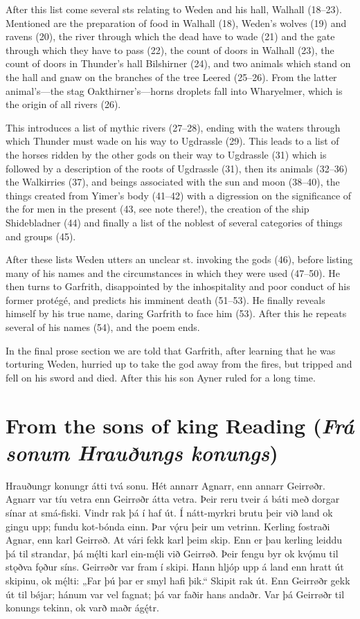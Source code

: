 After this list come several sts relating to Weden and his hall, Walhall (18–23). Mentioned are the preparation of food in Walhall (18), Weden’s wolves (19) and ravens (20), the river through which the dead have to wade (21) and the gate through which they have to pass (22), the count of doors in Walhall (23), the count of doors in Thunder’s hall Bilshirner (24), and two animals which stand on the hall and gnaw on the branches of the tree Leered (25–26). From the latter animal’s—the stag Oakthirner’s—horns droplets fall into Wharyelmer, which is the origin of all rivers (26).

This introduces a list of mythic rivers (27–28), ending with the waters through which Thunder must wade on his way to Ugdrassle (29). This leads to a list of the horses ridden by the other gods on their way to Ugdrassle (31) which is followed by a description of the roots of Ugdrassle (31), then its animals (32–36) the Walkirries (37), and beings associated with the sun and moon (38–40), the things created from Yimer’s body (41–42) with a digression on the significance of the  for men in the present (43, see note there!), the creation of the ship Shidebladner (44) and finally a list of the noblest of several categories of things and groups (45).

After these lists Weden utters an unclear st. invoking the gods (46), before listing many of his names and the circumstances in which they were used (47–50). He then turns to Garfrith, disappointed by the inhospitality and poor conduct of his former protégé, and predicts his imminent death (51–53). He finally reveals himself by his true name, daring Garfrith to face him (53). After this he repeats several of his names (54), and the poem ends.

In the final prose section we are told that Garfrith, after learning that he was torturing Weden, hurried up to take the god away from the fires, but tripped and fell on his sword and died. After this his son Ayner ruled for a long time.

\sectionline

\section{From the sons of king Reading (\emph{Frá sonum Hrauðungs konungs})}

\bpg\bpa{}%
Hrauðungr konungr átti tvá sonu. Hét annarr Agnarr, enn annarr Geirrøðr.
Agnarr var tíu vetra enn Geirrøðr átta vetra. Þeir reru tveir á báti með dorgar sínar at smá-fiski.
Vindr rak þá í haf út. Í nátt-myrkri brutu þeir við land ok gingu upp; fundu kot-bónda einn.
Þar vǫ́ru þeir um vetrinn. Kerling fostraði Agnar, enn karl Geirrøð.
At vári fekk karl þeim skip. Enn er þau kerling leiddu þá til strandar, þá mę́lti karl ein-mę́li við Geirrøð.
Þeir fengu byr ok kvǫ́mu til stǫðva fǫður síns. Geirrøðr var fram í skipi.
Hann hljóp upp á land enn hratt út skipinu, ok mę́lti: „Far þú þar er smyl hafi þik.“
Skipit rak út. Enn Geirrøðr gekk út til bǿjar; hánum var vel fagnat; þá var faðir hans andaðr.
Var þá Geirrøðr til konungs tekinn, ok varð maðr ágę́tr.\epa

